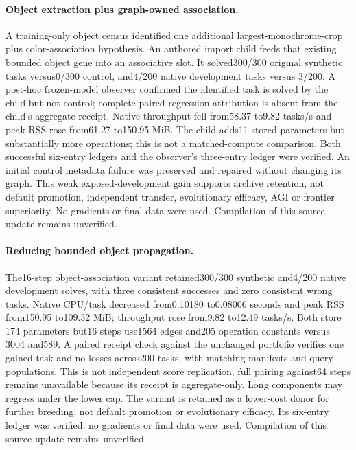 \documentclass[11pt]{article}
\begin{document}
\paragraph{Object extraction plus graph-owned association.}
A training-only object census identified one additional largest-monochrome-crop
plus color-association hypothesis. An authored import child feeds that existing
bounded object gene into an associative slot. It solved300/300 original
synthetic tasks versus0/300 control, and4/200 native development tasks versus
3/200. A post-hoc frozen-model observer confirmed the identified task is solved
by the child but not control; complete paired regression attribution is absent
from the child's aggregate receipt. Native throughput fell from58.37 to9.82
tasks/s and peak RSS rose from61.27 to150.95 MiB. The child adds11 stored
parameters but substantially more operations; this is not a matched-compute
comparison. Both successful six-entry ledgers and the observer's three-entry
ledger were verified. An initial control metadata failure was preserved and
repaired without changing its graph. This weak exposed-development gain supports
archive retention, not default promotion, independent transfer, evolutionary
efficacy, AGI or frontier superiority. No gradients or final data were used.
Compilation of this source update remains unverified.
\paragraph{Reducing bounded object propagation.}
The16-step object-association variant retained300/300 synthetic and4/200 native
development solves, with three consistent successes and zero consistent wrong
tasks. Native CPU/task decreased from0.10180 to0.08006 seconds and peak RSS
from150.95 to109.32 MiB; throughput rose from9.82 to12.49 tasks/s. Both store
174 parameters but16 steps use1564 edges and205 operation constants versus
3004 and589. A paired receipt check against the unchanged portfolio verifies
one gained task and no losses across200 tasks, with matching manifests and
query populations. This is not independent score replication; full pairing
against64 steps remains unavailable because its receipt is aggregate-only.
Long components may regress under the lower cap. The variant is retained as
a lower-cost donor for further breeding, not default promotion or evolutionary
efficacy. Its six-entry ledger was verified; no gradients or final data were used.
Compilation of this source update remains unverified.
\end{document}
